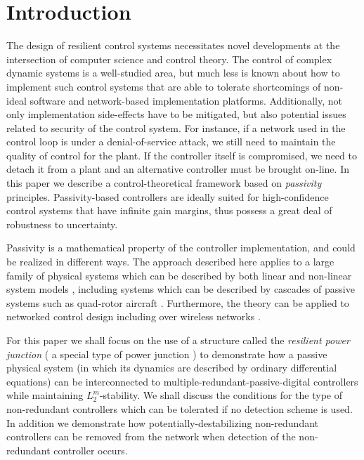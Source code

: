 \section{Introduction}
\label{S:introduction}
The design of resilient control systems necessitates novel developments at the 
intersection of computer science and control theory. The control of complex 
dynamic systems is a well-studied area, but much less is known about how to 
implement such control systems that are able to tolerate shortcomings of 
non-ideal software and network-based implementation platforms. Additionally, not 
only implementation side-effects have to be mitigated, but 
also potential issues related to security of the control system. For instance, 
if a network used in the control loop is under a denial-of-service attack, 
we still need to maintain the quality of control for the plant. If the controller
itself is compromised, we need to detach it from a plant and an alternative controller 
must be brought on-line. In this paper we describe a control-theoretical framework based on 
{\em passivity} principles. Passivity-based controllers are ideally suited for 
high-confidence control systems that have infinite gain margins, thus possess a 
great deal of robustness to uncertainty. 

Passivity is a mathematical property of the controller implementation, and could 
be realized in different ways. The approach described here applies to a large family 
of physical systems  which can be described by both linear and non-linear system models
\cite{haddad08:_nonlin_dynam_system_and_contr,
  schaft99:_l2_gain_passiv_nonlin_contr,
  ortega98:_passiv_based_contr_euler_lagran_system}, including
systems which can be described by cascades of passive systems such as
quad-rotor aircraft \cite{kottenstette08:_digit_passiv_attit_and_altit}.  Furthermore,
the theory can be applied to networked control design
\cite{antsaklis04:_special_issue_networ_contr_system,
  baillieul07:_special_issue} including over wireless networks 
\cite{kottenstette08:_wirel_digit_contr_of_contin}.

For this paper we shall focus on the use of a structure called the
{\em resilient power junction} ( a special type of power junction \cite{kottenstette08:_contr_of_multip_networ_passiv,
  kottenstette09:_digit_contr_of_multip_discr} )
to demonstrate how a passive physical system (in which its dynamics are
described by ordinary differential equations) can be interconnected to
multiple-redundant-passive-digital controllers while maintaining
$L^m_2$-stability.  We shall discuss the conditions for the type of
non-redundant controllers which can be tolerated if no detection
scheme is used.  In addition we demonstrate how 
potentially-destabilizing non-redundant controllers can be removed
from the network when detection of the non-redundant controller
occurs.

